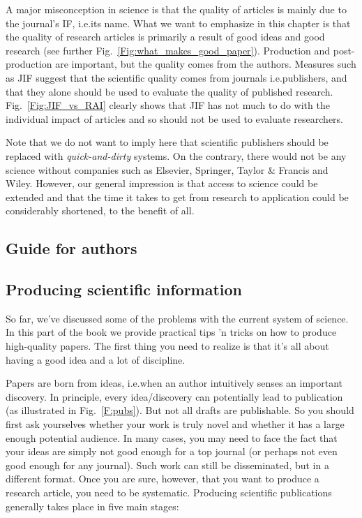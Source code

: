 \documentclass[graybox,envcountchap,sectrefs,UStrade]{svmono}
\begin{document}
A major misconception in science is that the quality of articles is mainly due to the journal's IF, i.e.\@ its name. What we want to emphasize in this chapter is that the quality of research articles is primarily a result of good ideas and good research (see further Fig.\@~\ref{Fig:what_makes_good_paper}). Production and post-production are important, but the quality comes from the authors. Measures such as JIF suggest that the scientific quality comes from journals i.e.\@ publishers, and that they alone should be used to evaluate the quality of published research. Fig.\@~\ref{Fig:JIF_vs_RAI} clearly shows that JIF has not much to do with the individual impact of articles and so should not be used to evaluate researchers. \par

Note that we do not want to imply here that scientific publishers should be replaced with \emph{quick-and-dirty} systems. On the  contrary, there would not be any science without companies such as Elsevier, Springer, Taylor \& Francis and Wiley. However, our general impression is that access to science could be extended and that the time it takes to get from research to application could be considerably shortened, to the benefit of all.  \par





\begin{partbacktext}
\part{Guide for authors}
\end{partbacktext}

\chapter{Producing scientific information}

So far, we've discussed some of the problems with the current system of science. In this part of the book we provide practical tips 'n tricks on how to produce high-quality papers. The first thing you need to realize is that it's all about having a good idea and a lot of discipline.\par

Papers are born from ideas, i.e.\@ when an author intuitively senses an important discovery. In principle, every idea/discovery can potentially lead to publication (as illustrated in Fig.\@~\ref{F:pubs}). But not all drafts are publishable. So you should first ask yourselves whether your work is truly novel and whether it has a large enough potential audience. In many cases, you may need to face the fact that your ideas are simply not good enough for a top journal (or perhaps not even good enough for any journal). Such work can still be disseminated, but in a different format. Once you are sure, however, that you want to produce a research article, you need to be systematic. Producing scientific publications generally takes place in five main stages:
\end{document}
